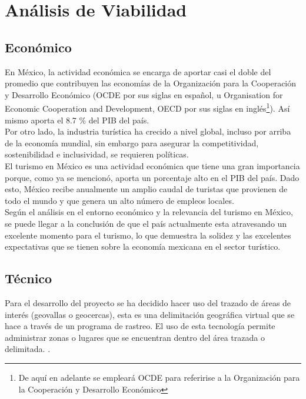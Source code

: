 \section{Análisis de Viabilidad}

\subsection{Económico}

En México, la actividad económica se encarga de aportar casi el doble del promedio que contribuyen las economías de la Organización para la Cooperación y Desarrollo Económico (OCDE por sus siglas en español, u Organisation for Economic Cooperation and Development, OECD por sus siglas en inglés\footnote{De aquí en adelante se empleará OCDE para referirise a la Organización para la Cooperación y Desarrollo Económico}). Así mismo aporta el 8.7 \% del PIB del país\cite{ocde}. \\

Por otro lado, la industria turística ha crecido a nivel global, incluso por arriba de la economía mundial, sin embargo para asegurar la competitividad, sostenibilidad e inclusividad, se requieren políticas. \cite{turismoEnMexico}\\ 

El turismo en México es una actividad económica que tiene una gran importancia porque, como ya se mencionó, aporta un porcentaje alto en el PIB del país. Dado esto, México recibe anualmente un amplio caudal de turistas que provienen de todo el mundo y que genera un alto número de empleos locales.\cite{importanciaTurismo} \\

Según el análisis en el entorno económico y la relevancia del turismo en México, se puede llegar a la conclusión de que el país actualmente esta atravesando un excelente momento para el turismo, lo que demuestra la solidez y las excelentes expectativas que se tienen sobre la economía mexicana en el sector turístico.\\

\subsection{Técnico}

Para el desarrollo del proyecto se ha decidido hacer uso del trazado de áreas de interés (geovallas o geocercas), esta es una delimitación geográfica virtual que se hace a través de un programa de rastreo. El uso de esta tecnología permite administrar zonas o lugares que se encuentran dentro del área trazada o delimitada. \cite{geovalla}. \\

